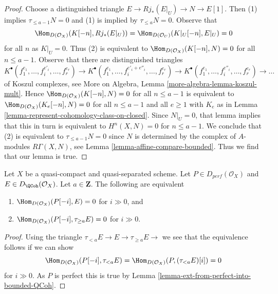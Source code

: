 \begin{proof}
Choose a distinguished triangle $E \to Rj_*(E|_U) \to N \to E[1]$. Then (1)
implies $\tau_{\leq a - 1}N = 0$ and (1) is implied by $\tau_{\leq a}N = 0$.
Observe that
$$
\Hom_{D(\mathcal{O}_X)}(K[-n], Rj_*(E|_U)) =
\Hom_{D(\mathcal{O}_U)}(K|_U[-n], E|_U) = 0
$$
for all $n$ as $K|_U = 0$. Thus (2) is equivalent to
$\Hom_{D(\mathcal{O}_X)}(K[-n], N) = 0$ for all $n \leq a - 1$. 
Observe that there are distinguished triangles
$$
K^\bullet(f_1^{e_1}, \ldots, f_i^{e'_i}, \ldots, f_r^{e_r}) \to
K^\bullet(f_1^{e_1}, \ldots, f_i^{e'_i + e''_i}, \ldots, f_r^{e_r}) \to
K^\bullet(f_1^{e_1}, \ldots, f_i^{e''_i}, \ldots, f_r^{e_r}) \to \ldots
$$
of Koszul complexes, see
More on Algebra, Lemma \ref{more-algebra-lemma-koszul-mult}. Hence
$\Hom_{D(\mathcal{O}_X)}(K[-n], N) = 0$ for all $n \leq a - 1$
is equivalent to
$\Hom_{D(\mathcal{O}_X)}(K_e[-n], N) = 0$ for all $n \leq a - 1$ and all $e \geq 1$
with $K_e$ as in Lemma \ref{lemma-represent-cohomology-class-on-closed}.
Since $N|_U = 0$, that lemma implies that this in turn is equivalent to
$H^n(X, N) = 0$ for $n \leq a - 1$. We conclude that (2) is equivalent to
$\tau_{\leq a - 1}N = 0$ since $N$ is determined by the complex of
$A$-modules $R\Gamma(X, N)$, see Lemma \ref{lemma-affine-compare-bounded}.
Thus we find that our lemma is true.
\end{proof}

\begin{lemma}
\label{lemma-bounded-truncation}
Let $X$ be a quasi-compact and quasi-separated scheme.
Let $P \in D_{perf}(\mathcal{O}_X)$ and $E \in D_{\QCoh}(\mathcal{O}_X)$. 
Let $a \in \mathbf{Z}$. The following are equivalent
\begin{enumerate}
\item $\Hom_{D(\mathcal{O}_X)}(P[-i], E) = 0$ for $i \gg 0$, and
\item $\Hom_{D(\mathcal{O}_X)}(P[-i], \tau_{\geq a} E) = 0$ for $i \gg 0$.
\end{enumerate}
\end{lemma}

\begin{proof}
Using the triangle $ \tau_{< a} E \to E \to \tau_{\geq a} E \to$
we see that the equivalence follows if we can show
$$
\Hom_{D(\mathcal{O}_X)}(P[-i], \tau_{< a} E) =
\Hom_{D(\mathcal{O}_X)}(P, (\tau_{< a} E)[i]) = 0 
$$
for $i \gg 0$. As $P$ is perfect this is true by
Lemma \ref{lemma-ext-from-perfect-into-bounded-QCoh}.
\end{proof}

